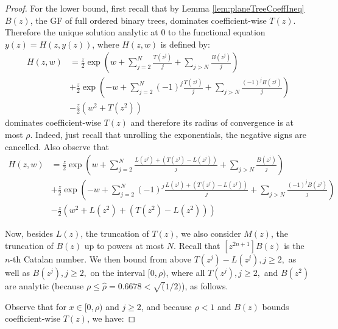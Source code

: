 \documentclass[10pt,a4paper]{amsart}
\newcommand{\nicetrees}{T}
\begin{document}
\begin{proof}
For the lower bound, first recall that
by Lemma \ref{lem:planeTreeCoeffIneq}     $B(z)$, the GF of full ordered binary trees, dominates coefficient-wise $T(z)$. Therefore the unique solution analytic at $0$ to the functional equation $y(z) = H(z, y(z))$, where  $H(z,w)$ is defined by: 
\begin{equation}\label{eq:upperBoundingSystem}
\begin{split}
    H(z,w) &=  \frac{z}{2} 
        \exp\left( w + \sum\limits_{j = 2}^{N} \frac{\nicetrees(z^j)}{j} 
        + \sum\limits_{j > N} \frac{B(z^j)}{j} \right)  \\ 
      &+\frac{z}{2}\exp\left(-w + \sum\limits_{j = 2}^{N} (-1)^j \frac{\nicetrees(z^j)}{j} 
      + \sum\limits_{j > N} \frac{(-1)^j B(z^j)}{j} \right) \\&
       -\frac{z}{2}\left(w^2 + T(z^2) \right)
\end{split}
\end{equation}
dominates coefficient-wise $\nicetrees(z)$ and therefore its radius of convergence is at most $\rho$. Indeed, just recall that unrolling the exponentials, the negative signs are cancelled.  Also observe that 
\begin{equation}\label{eq:upperBoundingSystem2}
\begin{split}
    H(z,w) &=  \frac{z}{2} 
        \exp\left( w + \sum\limits_{j = 2}^{N} \frac{L(z^j) +(T(z^j) - L(z^j))}{j}
        + \sum\limits_{j > N} \frac{B(z^j)}{j} \right)  \\ 
      &+\frac{z}{2}\exp\left(-w + \sum\limits_{j = 2}^{N} (-1)^j \frac{L(z^j) +(T(z^j) - L(z^j))}{j} 
      + \sum\limits_{j > N} \frac{(-1)^j B(z^j)}{j} \right) \\
      &-\frac{z}{2}\left(w^2 + L(z^2) +(T(z^2) - L(z^2))\right)
\end{split}
\end{equation}
 
Now, besides $L(z)$, the truncation of $T(z)$,  we also consider $M(z)$, the truncation of $B(z)$ up to powers at most $N$. Recall that $[z^{2n+1}]B(z)$ is the $n$-th Catalan number. 
We then  bound from above  
$\nicetrees(z^j) - L(z^j), j\geq 2,$  as well as $B(z^j),j \geq 2,$
 on the  interval $[0,\rho)$,  where all  $\nicetrees(z^j), j\geq 2,$ and $B(z^2)$ are analytic (because $\rho \leq  \hat{\rho} =  0.6678 < \sqrt(1/2)$), as follows.  

Observe that for $x \in [0,\rho)$ and $j\geq 2$, and because $\rho <1$ and  $B(z)$ bounds coefficient-wise $T(z)$, we have:


\end{proof}
\end{document}
